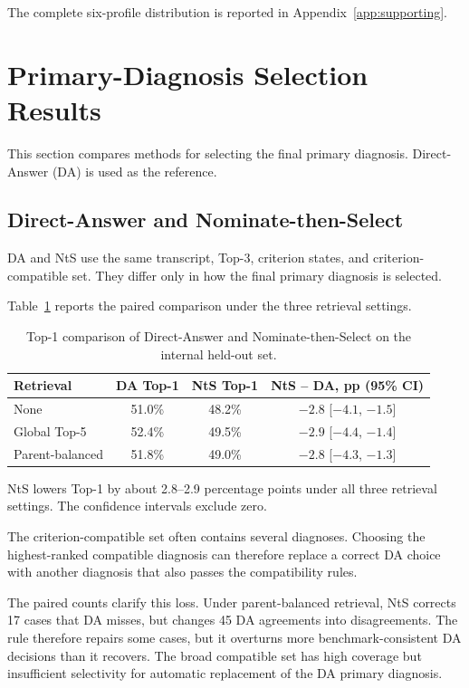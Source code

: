 \documentclass[12pt,a4paper,oneside]{report}
\begin{document}
The complete six-profile distribution is reported in
Appendix~\ref{app:supporting}.

\section{Primary-Diagnosis Selection Results}
\label{sec:nts-factorial}
\label{sec:additional-selection-results}

This section compares methods for selecting the final primary diagnosis.
Direct-Answer (DA) is used as the reference.

\subsection{Direct-Answer and Nominate-then-Select}

DA and NtS use the same transcript, Top-3, criterion states, and
criterion-compatible set. They differ only in how the final primary
diagnosis is selected.

Table~\ref{tab:nts-factorial} reports the paired comparison under the
three retrieval settings.

\begin{table}[htbp]
\centering
\caption{Top-1 comparison of Direct-Answer and Nominate-then-Select on
the internal held-out set.}
\label{tab:nts-factorial}
\small
\begin{tabular}{|l|c|c|c|}
\hline
\textbf{Retrieval} &
\textbf{DA Top-1} &
\textbf{NtS Top-1} &
\textbf{NtS -- DA, pp (95\% CI)}\\
\hline
None &
51.0\% &
48.2\% &
$-2.8$ [$-4.1$, $-1.5$]\\
\hline
Global Top-5 &
52.4\% &
49.5\% &
$-2.9$ [$-4.4$, $-1.4$]\\
\hline
Parent-balanced &
51.8\% &
49.0\% &
$-2.8$ [$-4.3$, $-1.3$]\\
\hline
\end{tabular}
\end{table}

NtS lowers Top-1 by about 2.8--2.9 percentage points under all three
retrieval settings. The confidence intervals exclude zero.

The criterion-compatible set often contains several diagnoses. Choosing
the highest-ranked compatible diagnosis can therefore replace a correct
DA choice with another diagnosis that also passes the compatibility
rules.

The paired counts clarify this loss. Under parent-balanced retrieval,
NtS corrects 17 cases that DA misses, but changes 45 DA agreements into
disagreements. The rule therefore repairs some cases, but it overturns
more benchmark-consistent DA decisions than it recovers. The broad
compatible set has high coverage but insufficient selectivity for
automatic replacement of the DA primary diagnosis.
\end{document}
